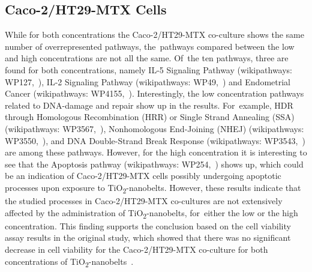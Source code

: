 \documentclass[ijms,article,accept,moreauthors,pdftex]{Definitions/mdpi}
\begin{document}
\begin{paracol}{2}
\subsection{{Caco-2/HT29-MTX} Cells}
While for both concentrations the {Caco-2/HT29-MTX co-culture} shows the same number of overrepresented pathways, the~pathways compared between the low and high concentrations are not all the same. Of~the ten pathways, three are found for both concentrations, namely IL-5 Signaling Pathway (wikipathways: WP127,~\cite{WP127}), IL-2 Signaling Pathway (wikipathways: WP49,~\cite{WP49}) and Endometrial Cancer (wikipathways: WP4155,~\cite{WP4155}). 
Interestingly, the low concentration pathways related to DNA-damage and repair show up in the results. %
For~example, HDR through Homologous Recombination (HRR) or Single Strand Annealing (SSA) (wikipathways: WP3567,~\cite{WP3567}), Nonhomologous End-Joining (NHEJ) (wikipathways: WP3550,~\cite{WP3550}), and DNA Double-Strand Break Response (wikipathways: WP3543,~\cite{WP3543}) are among these pathways. However, for the high concentration it is interesting to see that the Apoptosis pathway (wikipathways: WP254,~\cite{WP254}) shows up, which could be an indication of {Caco-2/HT29-MTX} cells possibly undergoing apoptotic processes upon exposure to TiO\textsubscript{2}-nanobelts. However, these results indicate that the studied processes in {Caco-2/HT29-MTX co-cultures} are not extensively affected by the administration of TiO\textsubscript{2}-nanobelts, for~either the low or the high concentration. This finding supports the conclusion based on the cell viability assay results in the original study, which showed that there was no significant decrease in cell viability for the {Caco-2/HT29-MTX co-culture} for both concentrations of TiO\textsubscript{2}-nanobelts~\cite{Tilton2013}. 


\end{paracol}
\end{document}
